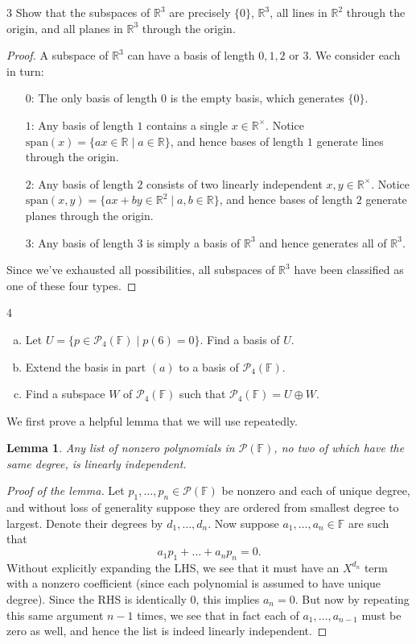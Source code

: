 \documentclass[11pt]{extarticle}
\newenvironment{problem}[1]{\begin{prob*}{#1}{}}{\end{prob*}}
\newtheorem{lemma}[thm]{Lemma}
\newcommand{\R}{\mathbb{R}}
\newcommand{\F}{\mathbb{F}}
\newcommand{\Span}{\mathrm{span}}
\begin{document}
\begin{problem}{3}
Show that the subspaces of $\R^3$ are precisely $\{0\}$, $\R^3$, all lines in $\R^2$ through the origin, and all planes in $\R^3$ through the origin.
\end{problem}
\begin{proof}
A subspace of $\R^3$ can have a basis of length $0,1,2$ or $3$.  We consider each in turn:
\begin{itemize}
\item[$0$:] The only basis of length $0$ is the empty basis, which generates $\{0\}$.
\item[$1$:] Any basis of length $1$ contains a single $x\in\R^\times$.  Notice $\Span(x)=\{ax\in\R\mid a\in\R\}$, and hence bases of length $1$ generate lines through the origin.
\item[$2$:] Any basis of length $2$ consists of two linearly independent $x,y\in\R^\times$.  Notice $\Span(x,y)=\{ax + by\in\R^2\mid a,b\in\R\}$, and hence bases of length $2$ generate planes through the origin.
\item[$3$:] Any basis of length $3$ is simply a basis of $\R^3$ and hence generates all of $\R^3$.
\end{itemize}
Since we've exhausted all possibilities, all subspaces of $\R^3$ have been classified as one of these four types.
\end{proof}

\begin{problem}{4}
\begin{enumerate}[(a)]
\item Let $U=\{p\in\mathcal{P}_4(\F)\mid p(6) = 0\}$.  Find a basis of $U$.
\item Extend the basis in part $(a)$ to a basis of $\mathcal{P}_4(\F)$.
\item Find a subspace $W$ of $\mathcal{P}_4(\F)$ such that $\mathcal{P}_4(\F)=U\oplus W$.
\end{enumerate}
\end{problem}
\noindent We first prove a helpful lemma that we will use repeatedly.
\begin{lemma}
Any list of nonzero polynomials in $\mathcal{P}(\F)$, no two of which have the same degree, is linearly independent.
\end{lemma}
\begin{proof}[Proof of the lemma]
Let $p_1,\dots, p_n\in\mathcal{P}(\F)$ be nonzero and each of unique degree, and without loss of generality suppose they are ordered from smallest degree to largest.  Denote their degrees by $d_1,\dots,d_n$.  Now suppose $a_1,\dots, a_n\in\F$ are such that
\begin{equation*}
a_1p_1 + \dots + a_np_n = 0.
\end{equation*}
Without explicitly expanding the LHS, we see that it must have an $X^{d_n}$ term with a nonzero coefficient (since each polynomial is assumed to have unique degree).  Since the RHS is identically $0$, this implies $a_n=0$.  But now by repeating this same argument $n-1$ times, we see that in fact each of $a_1,\dots,a_{n-1}$ must be zero as well, and hence the list is indeed linearly independent.
\end{proof}
\end{document}
